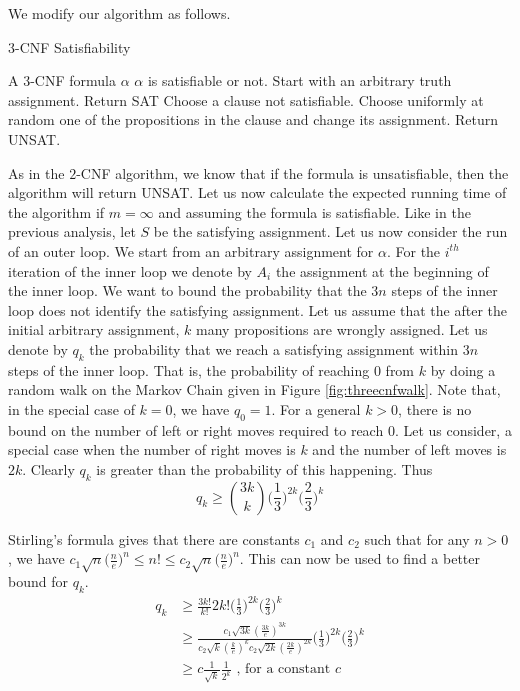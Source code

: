 We modify our algorithm as follows.
\begin{algorithm}
 \caption{$3$-CNF Satisfiability}
 \label{alg:randthreecnf}
 \begin{algorithmic}[1]
 \renewcommand{\algorithmicrequire}{\textbf{Input:}}
 \renewcommand{\algorithmicensure}{\textbf{Output:}}
 \REQUIRE A $3$-CNF formula $\alpha$
 \ENSURE  $\alpha$ is satisfiable or not.
	 \STATE Start with an arbitrary truth assignment.
			 \STATE Return SAT
		 \ENDIF			 
		 \STATE Choose a clause not satisfiable.
		 \STATE Choose uniformly at random one of the propositions in the clause and change its assignment.
 	\ENDFOR
 \ENDFOR
 \STATE Return UNSAT.
\end{algorithmic} 
\end{algorithm}

As in the $2$-CNF algorithm, we know that if the formula is unsatisfiable, then the algorithm will return UNSAT. Let us now calculate the expected running time of the algorithm if $m=\infty$ and assuming the formula is satisfiable. Like in the previous analysis, let $S$ be the satisfying assignment. Let us now consider the run of an outer loop. We start from an arbitrary assignment for $\alpha$.  For the $i^{th}$ iteration of the inner loop we denote by $A_i$ the assignment at the beginning of the inner loop. We want to bound the probability that the $3n$ steps of the inner loop does not identify the satisfying assignment. Let us assume that the after the initial arbitrary assignment, $k$ many propositions are wrongly assigned. Let us denote by $q_k$ the probability that we reach a satisfying assignment within $3n$ steps of the inner loop. That is, the probability of reaching $0$ from $k$ by doing a random walk on the Markov Chain given in Figure \ref{fig:threecnfwalk}. Note that, in the special case of $k=0$, we have $q_0 = 1$. For a general $k>0$, there is no bound on the number of left or right moves required to reach $0$. Let us consider, a special case when the number of right moves is $k$ and the number of left moves is $2k$. Clearly $q_k$ is greater than the probability of this happening. Thus
\[
q_k \geq {3k \choose k} \big(\frac{1}{3}\big)^{2k} \big( \frac{2}{3} \big)^k
\]

Stirling's formula gives that there are constants $c_1$ and $c_2$ such that for any $n>0$, we have $c_1 \sqrt{n} \big(\frac{n}{e}\big)^n \leq n! \leq  c_2 \sqrt{n} \big(\frac{n}{e}\big)^n$. This can now be used to find a better bound for $q_k$.
\begin{align*}
q_k & \geq \frac{3k!}{k!}{2k!} \big(\frac{1}{3}\big)^{2k} \big( \frac{2}{3} \big)^k \\
& \geq \frac{c_1\sqrt{3k} (\frac{3k}{e})^{3k}}{c_2 \sqrt{k} (\frac{k}{e})^k c_2 \sqrt{2k} (\frac{2k}{e})^{2k}} \big(\frac{1}{3}\big)^{2k} \big( \frac{2}{3} \big)^k \\
& \geq c \frac{1}{\sqrt{k}} \frac{1}{2^k} \text{  , for a constant } c
\end{align*}

